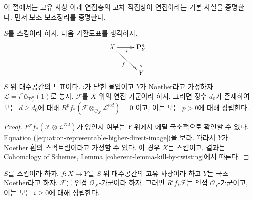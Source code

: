 \noindent
이 절에서는 고유 사상 아래 연접층의 고차 직접상이 연접이라는
기본 사실을 증명한다. 먼저 보조 보조정리를 증명한다.

\begin{lemma}
\label{lemma-kill-by-twisting}
$S$를 스킴이라 하자. 다음 가환도표를 생각하자.
$$
\xymatrix{
X \ar[r]_i \ar[rd]_f & \mathbf{P}^n_Y \ar[d] \\
& Y
}
$$
$S$ 위 대수공간의 도표이다.
$i$가 닫힌 몰입이고 $Y$가 Noether라고 가정하자.
$\mathcal{L} = i^*\mathcal{O}_{\mathbf{P}^n_Y}(1)$로 놓자.
$\mathcal{F}$를 $X$ 위의 연접 가군이라 하자. 그러면 정수 $d_0$가
존재하여 모든 $d \geq d_0$에 대해
$R^pf_*(\mathcal{F} \otimes_{\mathcal{O}_X} \mathcal{L}^{\otimes d}) = 0$
이고, 이는 모든 $p > 0$에 대해 성립한다.
\end{lemma}

\begin{proof}
$R^pf_*(\mathcal{F} \otimes \mathcal{L}^{\otimes d})$가 영인지 여부는
$Y$ 위에서 에탈 국소적으로 확인할 수 있다. Equation
(\ref{equation-representable-higher-direct-image})을 보라. 따라서
$Y$가 Noether 환의 스펙트럼이라고 가정할 수 있다. 이 경우 $X$는
스킴이고, 결과는 Cohomology of Schemes, Lemma
\ref{coherent-lemma-kill-by-twisting}에서 따른다.
\end{proof}

\begin{lemma}
\label{lemma-proper-pushforward-coherent}
$S$를 스킴이라 하자. $f : X \to Y$를 $S$ 위 대수공간의 고유
사상이라 하고 $Y$는 국소 Noether라고 하자. $\mathcal{F}$를 연접
$\mathcal{O}_X$-가군이라 하자. 그러면 $R^if_*\mathcal{F}$는 연접
$\mathcal{O}_Y$-가군이고, 이는 모든 $i \geq 0$에 대해 성립한다.
\end{lemma}

